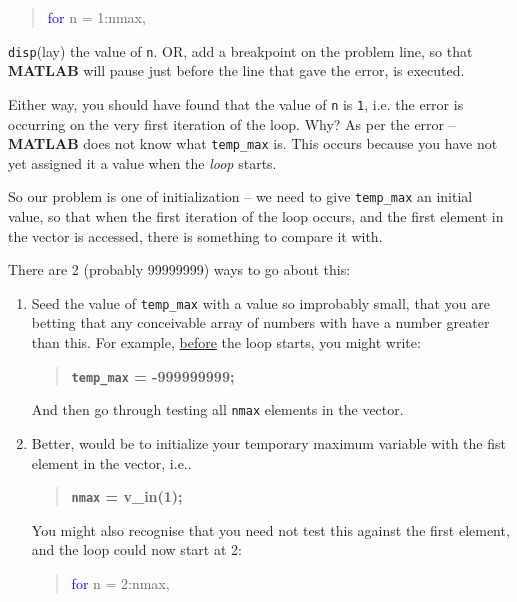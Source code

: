 \documentclass{tufte-book} %
\newenvironment{docspec}{\begin{quotation}\ttfamily\parskip0pt\parindent0pt\ignorespaces}{\end{quotation}}
\newenvironment{docspecbold}{\begin{quotation}\ttfamily\bfseries\parskip0pt\parindent0pt\ignorespaces}{\end{quotation}}
\begin{document}
\begin{docspec}
\textcolor{blue}{for} n = 1:nmax,
\end{docspec} 

\noindent \texttt{disp}(lay) the value of \texttt{n}. OR, add a breakpoint on the problem line, so that \textbf{MATLAB} will pause just before the line that gave the error, is executed.

Either way, you should have found that the value of \texttt{n} is \texttt{1}, i.e. the error is occurring on the very first iteration of the loop. Why? As per the error -- \textbf{MATLAB} does not know what \texttt{temp\_max} is. This occurs because you have not yet assigned it a value when the \textit{loop} starts.

So our problem is one of initialization -- we need to give \texttt{temp\_max} an initial value, so that when the first iteration of the loop occurs, and the first element in the vector is accessed, there is something to compare it with.

There are 2 (probably 99999999) ways to go about this:
 
\begin{enumerate}[noitemsep]
\setlength{\itemindent}{.2in}
\vspace{1mm}
\item Seed the value of \texttt{temp\_max} with a value so improbably small, that you are betting that any conceivable array of numbers with have a number greater than this. For example, \uline{before} the loop starts, you might write:
\begin{docspecbold}
\texttt{temp\_max} = -999999999;
\end{docspecbold} And then go through testing all \texttt{nmax} elements in the vector.
\vspace{1mm}
\item Better, would be to initialize your temporary maximum variable with the fist element in the vector, i.e..
\begin{docspecbold}
\texttt{nmax} = v\_in(1);
\end{docspecbold}
You might also recognise that you need not test this against the first element, and the loop could now start at 2:
\begin{docspec}
\textcolor{blue}{for} n = 2:nmax,
\end{docspec} 
\end{enumerate}
\end{document}
